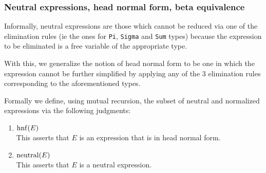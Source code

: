 \documentclass{article}
\begin{document}

\subsubsection{Neutral expressions, head normal form, beta equivalence}
Informally, neutral expressions are those which cannot be reduced via one of the 
elimination rules (ie the ones for \verb|Pi|, \verb|Sigma| and \verb|Sum| types)
because the expression to be eliminated is a free variable of the appropriate
type.

With this, we generalize the notion of head normal form to be one in which
the expression cannot be further simplified by applying any of the 3
elimination rules corresponding to the aforementioned types.

Formally we define, using mutual recursion, the subset of neutral and 
normalized expressions via the following judgments:
\begin{enumerate}
  \item $\operatorname{hnf}(E)$ \\
    This asserts that $E$ is an expression that is in head normal form.
  
  \item $\operatorname{neutral}(E)$ \\
    This asserts that $E$ is a neutral expression.
\end{enumerate}
\end{document}
